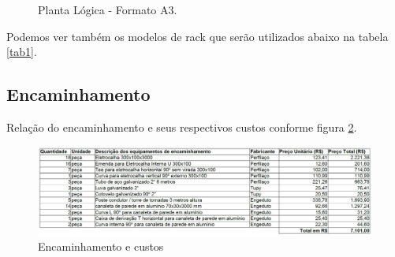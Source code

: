 \documentclass[	DIV=calc,%
							paper=a4,%
							fontsize=12pt,%
							onecolumn]{scrartcl}	 					%
\begin{document}

\clearpage
\thispagestyle{plain}

\recalctypearea

\begin{figure}
	\noindent{}
	\caption{Planta Lógica - Formato A3.}
	\label{figura3}
\end{figure}

\clearpage
{}
\recalctypearea




Podemos ver também os modelos de rack que serão utilizados abaixo na tabela \ref{tab1}.



\subsection{Encaminhamento}

Relação do encaminhamento e seus respectivos custos conforme figura \ref{figura4}.  
\begin{figure}[H]
	\centering
	\includegraphics[width=\textwidth]{figura4}
	\caption{Encaminhamento e custos}
	\label{figura4}
\end{figure}

 
\end{document}
